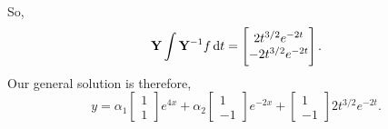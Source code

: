 \begin{example}
\begin{align*}
    \end{align*}
    So,
    $$\mathbf{Y}\int \mathbf{Y}^{-1} f \dif t = \begin{bmatrix} 2t^{3/2}e^{-2t} \\ -2t^{3/2}e^{-2t}\end{bmatrix}.$$
    Our general solution is therefore,
    $$y = \alpha_1 \begin{bmatrix} 1 \\ 1 \end{bmatrix}e^{4x} + \alpha_2
    \begin{bmatrix} 1 \\ -1 \end{bmatrix}e^{-2x}+\begin{bmatrix} 1 \\ -1\end{bmatrix}2t^{3/2}e^{-2t}.$$
\end{example}


